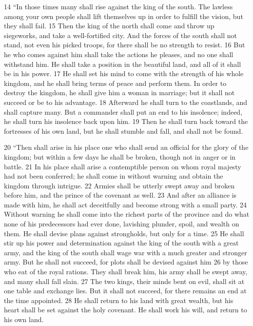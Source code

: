 14 ``In those times many shall rise against the king of the south. The lawless 
among your own people shall lift themselves up in order to fulfill the vision, 
but they shall fail. 15 Then the king of the north shall come and throw up 
siegeworks, and take a well-fortified city. And the forces of the south shall 
not stand, not even his picked troops, for there shall be no strength to resist.
16 But he who comes against him shall take the actions he pleases, and no one 
shall withstand him. He shall take a position in the beautiful land, and all of 
it shall be in his power. 17 He shall set his mind to come with the strength of 
his whole kingdom, and he shall bring terms of peace and perform them. In order 
to destroy the kingdom, he shall give him a woman in marriage; but it shall not 
succeed or be to his advantage. 18 Afterward he shall turn to the coastlands, 
and shall capture many. But a commander shall put an end to his insolence; 
indeed, he shall turn his insolence back upon him. 19 Then he shall turn back 
toward the fortresses of his own land, but he shall stumble and fall, and shall 
not be found.

20 ``Then shall arise in his place one who shall send an official for the glory 
of the kingdom; but within a few days he shall be broken, though not in anger or 
in battle. 21 In his place shall arise a contemptible person on whom royal 
majesty had not been conferred; he shall come in without warning and obtain the 
kingdom through intrigue. 22 Armies shall be utterly swept away and broken 
before him, and the prince of the covenant as well. 23 And after an alliance is 
made with him, he shall act deceitfully and become strong with a small party.
24 Without warning he shall come into the richest parts of the province and do 
what none of his predecessors had ever done, lavishing plunder, spoil, and 
wealth on them. He shall devise plans against strongholds, but only for a time.
25 He shall stir up his power and determination against the king of the south 
with a great army, and the king of the south shall wage war with a much greater 
and stronger army. But he shall not succeed, for plots shall be devised against 
him 26 by those who eat of the royal rations. They shall break him, his army 
shall be swept away, and many shall fall slain. 27 The two kings, their minds 
bent on evil, shall sit at one table and exchange lies. But it shall not 
succeed, for there remains an end at the time appointed. 28 He shall return to 
his land with great wealth, but his heart shall be set against the holy 
covenant. He shall work his will, and return to his own land.

